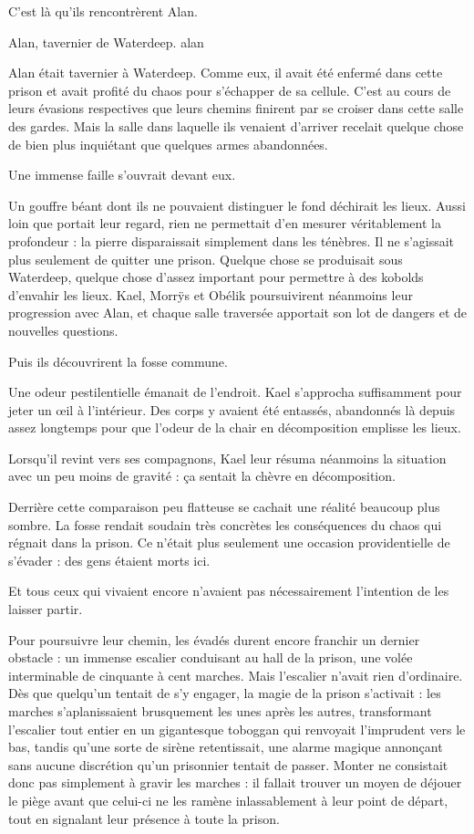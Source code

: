 C'est là qu'ils rencontrèrent Alan.

{Alan, tavernier de Waterdeep.}
{alan}

Alan était tavernier à Waterdeep. Comme eux, il avait été enfermé dans cette prison et avait profité du chaos pour s'échapper de sa cellule. C'est au cours de leurs évasions respectives que leurs chemins finirent par se croiser dans cette salle des gardes. Mais la salle dans laquelle ils venaient d'arriver recelait quelque chose de bien plus inquiétant que quelques armes abandonnées.

Une immense faille s'ouvrait devant eux.

Un gouffre béant dont ils ne pouvaient distinguer le fond déchirait les lieux. Aussi loin que portait leur regard, rien ne permettait d'en mesurer véritablement la profondeur : la pierre disparaissait simplement dans les ténèbres. Il ne s'agissait plus seulement de quitter une prison. Quelque chose se produisait sous Waterdeep, quelque chose d'assez important pour permettre à des kobolds d'envahir les lieux. Kael, Morrÿs et Obélik poursuivirent néanmoins leur progression avec Alan, et chaque salle traversée apportait son lot de dangers et de nouvelles questions.

Puis ils découvrirent la fosse commune.

Une odeur pestilentielle émanait de l'endroit. Kael s'approcha suffisamment pour jeter un œil à l'intérieur. Des corps y avaient été entassés, abandonnés là depuis assez longtemps pour que l'odeur de la chair en décomposition emplisse les lieux.

Lorsqu'il revint vers ses compagnons, Kael leur résuma néanmoins la situation avec un peu moins de gravité : ça sentait la chèvre en décomposition.

Derrière cette comparaison peu flatteuse se cachait une réalité beaucoup plus sombre. La fosse rendait soudain très concrètes les conséquences du chaos qui régnait dans la prison. Ce n'était plus seulement une occasion providentielle de s'évader : des gens étaient morts ici.

Et tous ceux qui vivaient encore n'avaient pas nécessairement l'intention de les laisser partir.

Pour poursuivre leur chemin, les évadés durent encore franchir un dernier obstacle : un immense escalier conduisant au hall de la prison, une volée interminable de cinquante à cent marches. Mais l'escalier n'avait rien d'ordinaire. Dès que quelqu'un tentait de s'y engager, la magie de la prison s'activait : les marches s'aplanissaient brusquement les unes après les autres, transformant l'escalier tout entier en un gigantesque toboggan qui renvoyait l'imprudent vers le bas, tandis qu'une sorte de sirène retentissait, une alarme magique annonçant sans aucune discrétion qu'un prisonnier tentait de passer. Monter ne consistait donc pas simplement à gravir les marches : il fallait trouver un moyen de déjouer le piège avant que celui-ci ne les ramène inlassablement à leur point de départ, tout en signalant leur présence à toute la prison.

